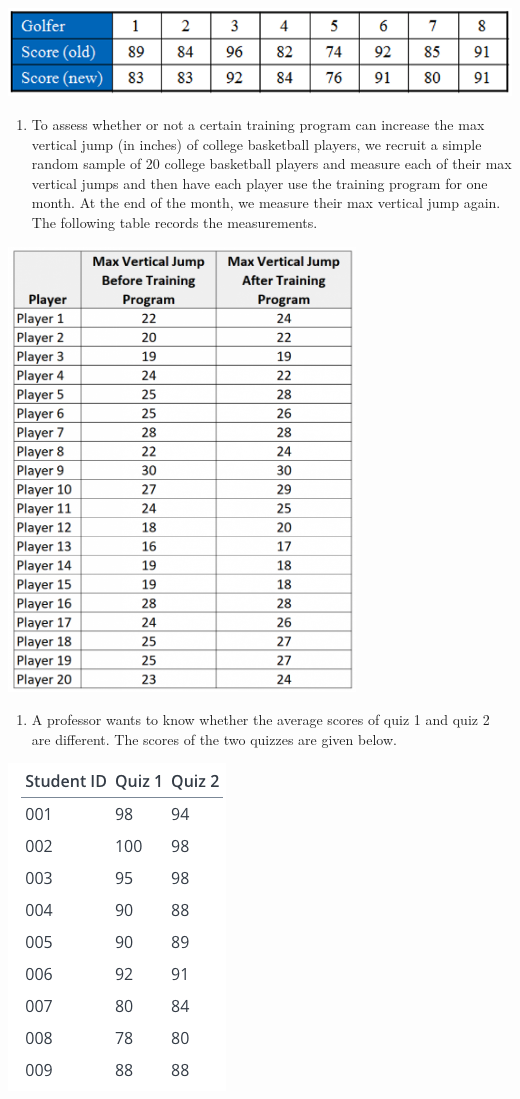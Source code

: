 \documentclass[
]{book}
\providecommand{\tightlist}{%
  \setlength{\itemsep}{0pt}\setlength{\parskip}{0pt}}
\begin{document}
\begin{center}\includegraphics[width=0.55\linewidth]{week10/ex02Data} \end{center}

\begin{enumerate}
\def\labelenumi{\arabic{enumi}.}
\setcounter{enumi}{3}
\tightlist
\item
  To assess whether or not a certain training program can increase the max vertical jump (in inches) of college basketball players, we recruit a simple random sample of 20 college basketball players and measure each of their max vertical jumps and then have each player use the training program for one month. At the end of the month, we measure their max vertical jump again. The following table records the measurements.
\end{enumerate}

\begin{center}\includegraphics[width=0.4\linewidth]{week10/ex03Data} \end{center}

\begin{enumerate}
\def\labelenumi{\arabic{enumi}.}
\setcounter{enumi}{4}
\tightlist
\item
  A professor wants to know whether the average scores of quiz 1 and quiz 2 are different. The scores of the two quizzes are given below.
\end{enumerate}

\begin{center}\includegraphics[width=0.2\linewidth]{week10/ex04Data} \end{center}
\end{document}
